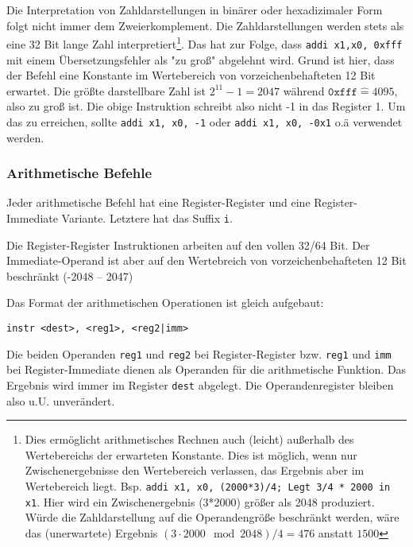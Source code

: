 \begin{warningblock}

  Die Interpretation von Zahldarstellungen in binärer oder hexadizimaler Form
  folgt nicht immer dem Zweierkomplement. Die Zahldarstellungen werden stets als
  eine 32 Bit lange Zahl interpretiert\footnote{Dies ermöglicht arithmetisches
  Rechnen auch (leicht) außerhalb des Wertebereichs der erwarteten Konstante.
  Dies ist möglich, wenn nur Zwischenergebnisse den Wertebereich verlassen, das
  Ergebnis aber im Wertebereich liegt. Bsp. \texttt{addi x1, x0, (2000*3)/4;
  Legt 3/4 * 2000 in x1}. Hier wird ein Zwischenergebnis (3*2000) größer als
  2048 produziert. Würde die Zahldarstellung auf die Operandengröße beschränkt
  werden, wäre das (unerwartete) Ergebnis $(3 \cdot 2000 \mod 2048)/4 = 476$
  anstatt $1500$}. Das hat zur Folge, dass \texttt{addi x1,x0, 0xfff} mit einem
  Übersetzungsfehler als "zu groß" abgelehnt wird. Grund ist hier, dass der
  Befehl eine Konstante im Wertebereich von vorzeichenbehafteten 12 Bit
  erwartet. Die größte darstellbare Zahl ist $2^{11}-1 = 2047$ während $\mathtt{0xfff}  \widehat{=} 4095$, also zu groß ist. Die obige Instruktion schreibt also nicht
  -1 in das Register 1. Um das zu erreichen, sollte \texttt{addi x1, x0, -1}
  oder \texttt{addi x1, x0, -0x1} o.ä verwendet werden.

\end{warningblock}

\subsubsection{Arithmetische Befehle}
Jeder arithmetische Befehl hat eine Register-Register und eine Register-Immediate Variante. Letztere hat das Suffix \texttt{i}.
\begin{warningblock}

	Die Register-Register Instruktionen arbeiten auf den vollen 32/64 Bit. Der
	Immediate-Operand ist aber auf den Wertebreich von vorzeichenbehafteten 12 Bit
	beschränkt (-2048 -- 2047)

\end{warningblock}

Das Format der arithmetischen Operationen ist gleich aufgebaut:
\begin{center}
	\texttt{instr <dest>, <reg1>, <reg2|imm>}
\end{center}

Die beiden Operanden \texttt{reg1} und \texttt{reg2} bei Register-Register bzw.
\texttt{reg1} und \texttt{imm} bei Register-Immediate dienen als Operanden für
die arithmetische Funktion. Das Ergebnis wird immer im Register \texttt{dest}
abgelegt. Die Operandenregister bleiben also u.U. unverändert.

